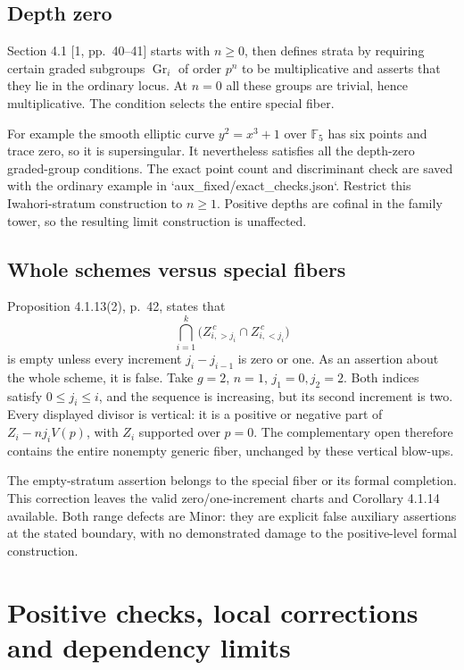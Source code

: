 \documentclass[10pt]{article}
\begin{document}
\subsection*{Depth zero}
Section 4.1 [1, pp. 40–41] starts with \(n\geq0\), then defines strata by requiring certain graded subgroups \(\operatorname{Gr}_i\) of order \(p^n\) to be multiplicative and asserts that they lie in the ordinary locus. At \(n=0\) all these groups are trivial, hence multiplicative. The condition selects the entire special fiber.\par
For example the smooth elliptic curve \(y^2=x^3+1\) over \(\mathbb F_5\) has six points and trace zero, so it is supersingular. It nevertheless satisfies all the depth-zero graded-group conditions. The exact point count and discriminant check are saved with the ordinary example in `aux\_fixed/exact\_checks.json`. Restrict this Iwahori-stratum construction to \(n\geq1\). Positive depths are cofinal in the family tower, so the resulting limit construction is unaffected.\par
\subsection*{Whole schemes versus special fibers}
Proposition 4.1.13(2), p. 42, states that \[\bigcap_{i=1}^k
 \bigl(Z_{i,>j_i}^{\,c}\cap Z_{i,<j_i}^{\,c}\bigr)\] is empty unless every increment \(j_i-j_{i-1}\) is zero or one. As an assertion about the whole scheme, it is false. Take \(g=2\), \(n=1\), \(j_1=0,j_2=2\). Both indices satisfy \(0\leq j_i\leq i\), and the sequence is increasing, but its second increment is two. Every displayed divisor is vertical: it is a positive or negative part of \(Z_i-nj_iV(p)\), with \(Z_i\) supported over \(p=0\). The complementary open therefore contains the entire nonempty generic fiber, unchanged by these vertical blow-ups.\par
The empty-stratum assertion belongs to the special fiber or its formal completion. This correction leaves the valid zero/one-increment charts and Corollary 4.1.14 available. Both range defects are Minor: they are explicit false auxiliary assertions at the stated boundary, with no demonstrated damage to the positive-level formal construction.\par
\section*{Positive checks, local corrections and dependency limits}
\end{document}

